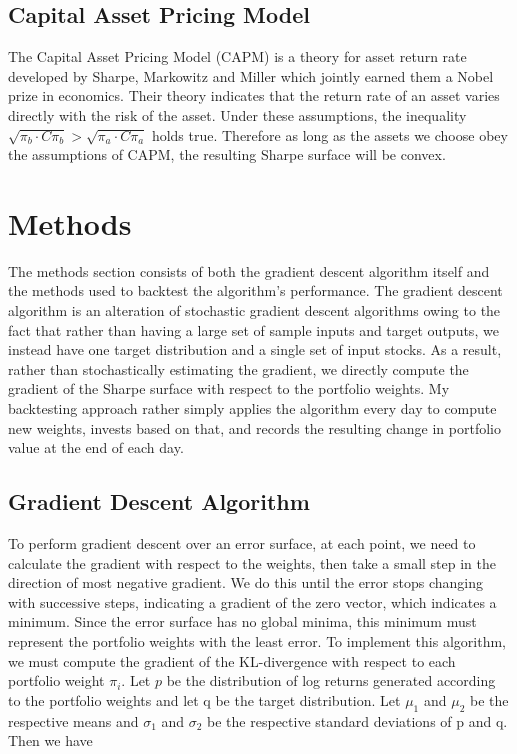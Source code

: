 \documentclass{article}
\begin{document}
\subsection{Capital Asset Pricing Model}
The Capital Asset Pricing Model (CAPM) is a theory for asset return rate developed by Sharpe, Markowitz and Miller which jointly earned them a Nobel prize in economics.  Their theory indicates that the return rate of an asset varies directly with the risk of the asset.  Under these assumptions, the inequality $\sqrt{\pi_b \cdot C \pi_b} > \sqrt{\pi_a \cdot C \pi_a}$ holds true.  Therefore as long as the assets we choose obey the assumptions of CAPM, the resulting Sharpe surface will be convex.


\section{Methods} 
The methods section consists of both the gradient descent algorithm itself and the methods used to backtest the algorithm’s performance. The gradient descent algorithm is an alteration of stochastic gradient descent algorithms owing to the fact that rather than having a large set of sample inputs and target outputs, we instead have one target distribution and a single set of input stocks. As a result, rather than stochastically estimating the gradient, we directly compute the gradient of the Sharpe surface with respect to the portfolio weights. My backtesting approach rather simply applies the algorithm every day to compute new weights, invests based on that, and records the resulting change in portfolio value at the end of each day.



\subsection{Gradient Descent Algorithm}
To perform gradient descent over an error surface, at each point, we need to calculate the gradient with respect to the weights, then take a small step in the direction of most negative gradient. We do this until the error stops changing with successive steps, indicating a gradient of the zero vector, which indicates a minimum. Since the error surface has no global minima, this minimum must represent the portfolio weights with the least error.
To implement this algorithm, we must compute the gradient of the KL-divergence with respect to each portfolio weight $\pi_i$. Let $p$ be the distribution of log returns generated according to the portfolio weights and let q be the target distribution. Let $\mu_1$ and $\mu_2$ be the respective means and $\sigma_1$ and $\sigma_2$ be the respective standard deviations of p and q. Then we have
\end{document}

